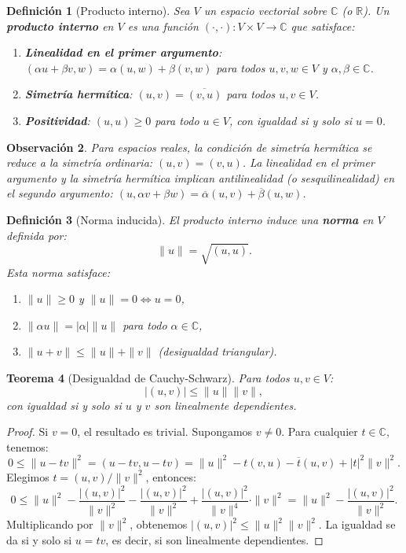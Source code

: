 \documentclass[a4paper,11pt]{report}
\newtheorem{theorem}{Teorema}[chapter]
\newtheorem{definition}[theorem]{Definición}
\newtheorem{remark}[theorem]{Observación}
\begin{document}
\begin{definition}[Producto interno]
Sea $V$ un espacio vectorial sobre $\mathbb{C}$ (o $\mathbb{R}$). Un \textbf{producto interno} en $V$ es una función $(\cdot,\cdot) : V \times V \to \mathbb{C}$ que satisface:
\begin{enumerate}
\item \textbf{Linealidad en el primer argumento}: $(\alpha u + \beta v, w) = \alpha(u,w) + \beta(v,w)$ para todos $u,v,w \in V$ y $\alpha, \beta \in \mathbb{C}$.
\item \textbf{Simetría hermítica}: $(u,v) = \overline{(v,u)}$ para todos $u,v \in V$.
\item \textbf{Positividad}: $(u,u) \geq 0$ para todo $u \in V$, con igualdad si y solo si $u = 0$.
\end{enumerate}
\end{definition}

\begin{remark}
Para espacios reales, la condición de simetría hermítica se reduce a la simetría ordinaria: $(u,v) = (v,u)$. La linealidad en el primer argumento y la simetría hermítica implican antilinealidad (o sesquilinealidad) en el segundo argumento: $(u, \alpha v + \beta w) = \overline{\alpha}(u,v) + \overline{\beta}(u,w)$.
\end{remark}

\begin{definition}[Norma inducida]
El producto interno induce una \textbf{norma} en $V$ definida por:
\[
\|u\| = \sqrt{(u,u)}.
\]
Esta norma satisface:
\begin{enumerate}
\item $\|u\| \geq 0$ y $\|u\| = 0 \Leftrightarrow u = 0$,
\item $\|\alpha u\| = |\alpha| \|u\|$ para todo $\alpha \in \mathbb{C}$,
\item $\|u + v\| \leq \|u\| + \|v\|$ (desigualdad triangular).
\end{enumerate}
\end{definition}

\begin{theorem}[Desigualdad de Cauchy-Schwarz]\label{thm:cauchy_schwarz_appendix}
Para todos $u, v \in V$:
\[
|(u,v)| \leq \|u\| \|v\|,
\]
con igualdad si y solo si $u$ y $v$ son linealmente dependientes.
\end{theorem}

\begin{proof}
Si $v = 0$, el resultado es trivial. Supongamos $v \neq 0$. Para cualquier $t \in \mathbb{C}$, tenemos:
\[
0 \leq \|u - tv\|^2 = (u-tv, u-tv) = \|u\|^2 - t(v,u) - \overline{t}(u,v) + |t|^2\|v\|^2.
\]
Elegimos $t = (u,v)/\|v\|^2$, entonces:
\[
0 \leq \|u\|^2 - \frac{|(u,v)|^2}{\|v\|^2} - \frac{|(u,v)|^2}{\|v\|^2} + \frac{|(u,v)|^2}{\|v\|^4} \cdot \|v\|^2 = \|u\|^2 - \frac{|(u,v)|^2}{\|v\|^2}.
\]
Multiplicando por $\|v\|^2$, obtenemos $|(u,v)|^2 \leq \|u\|^2 \|v\|^2$. La igualdad se da si y solo si $u = tv$, es decir, si son linealmente dependientes.
\end{proof}
\end{document}

